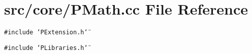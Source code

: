 \section{src/core/PMath.cc File Reference}
\label{PMath_8cc}


{\tt \#include \char`\"{}PExtension.h\char`\"{}}\par
{\tt \#include \char`\"{}PLibraries.h\char`\"{}}\par
